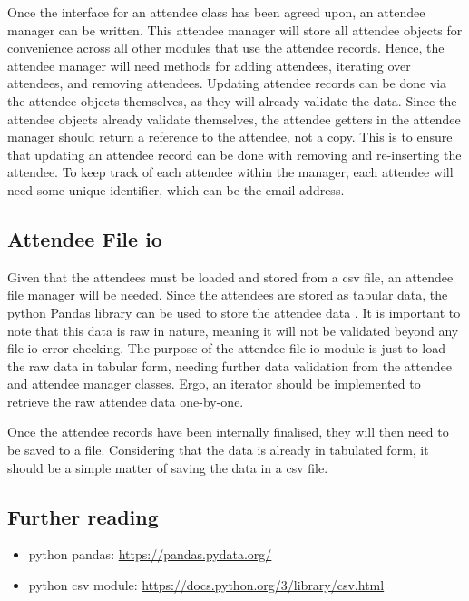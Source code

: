 \documentclass[11pt]{article}
\begin{document}
Once the interface for an attendee \gls{class} has been agreed upon, an attendee manager can be written. This attendee manager will store all attendee \glspl{object} for convenience across all other modules that use the attendee records. Hence, the attendee manager will need methods for adding attendees, iterating over attendees, and removing attendees. Updating attendee records can be done via the attendee \glspl{object} themselves, as they will already validate the data. Since the attendee \glspl{object} already validate themselves, the attendee getters in the attendee manager should return a reference to the attendee, not a copy. This is to ensure that updating an attendee record can be done with removing and re-inserting the attendee. To keep track of each attendee within the manager, each attendee will need some unique identifier, which can be the email address.

\subsection{Attendee File \acrshort{io}}

Given that the attendees must be loaded and stored from a \acrshort{csv} file, an attendee file manager will be needed. Since the attendees are stored as tabular data, the \Gls{python} Pandas \gls{library} can be used to store the attendee data \cite{pandas}. It is important to note that this data is raw in nature, meaning it will not be validated beyond any file \acrshort{io} error checking. The purpose of the attendee file \acrshort{io} module is just to load the raw data in tabular form, needing further data validation from the attendee and attendee manager classes. Ergo, an iterator should be implemented to retrieve the raw attendee data one-by-one.

Once the attendee records have been internally finalised, they will then need to be saved to a file. Considering that the data is already in tabulated form, it should be a simple matter of saving the data in a \acrshort{csv} file.

\subsection{Further reading}

\begin{itemize}
    \item \Gls{python} pandas: \url{https://pandas.pydata.org/}
    \item \Gls{python} \acrshort{csv} module: \url{https://docs.python.org/3/library/csv.html}
\end{itemize}
\end{document}
